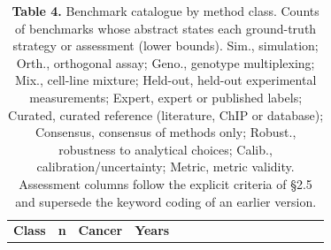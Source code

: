 \documentclass{article}
\begin{document}
\begin{longtable}[l]{@{}
  >{\raggedright\arraybackslash}p{}
  >{\raggedright\arraybackslash}p{}
  >{\raggedright\arraybackslash}p{}
  >{\raggedright\arraybackslash}p{}
  >{\raggedright\arraybackslash}p{}
  >{\raggedright\arraybackslash}p{}
  >{\raggedright\arraybackslash}p{}
  >{\raggedright\arraybackslash}p{}
  >{\raggedright\arraybackslash}p{}
  >{\raggedright\arraybackslash}p{}
  >{\raggedright\arraybackslash}p{}
  >{\raggedright\arraybackslash}p{}
  >{\raggedright\arraybackslash}p{}
  >{\raggedright\arraybackslash}p{}
  >{\raggedright\arraybackslash}p{}
  >{\raggedright\arraybackslash}p{}@{}}
\caption{\textbf{Table 4.} Benchmark catalogue by method class. Counts of
benchmarks whose abstract states each ground-truth strategy or
assessment (lower bounds). Sim., simulation; Orth., orthogonal assay;
Geno., genotype multiplexing; Mix., cell-line mixture; Held-out,
held-out experimental measurements; Expert, expert or published labels;
Curated, curated reference (literature, ChIP or database); Consensus,
consensus of methods only; Robust., robustness to analytical choices;
Calib., calibration/uncertainty; Metric, metric validity. Assessment
columns follow the explicit criteria of §2.5 and supersede the keyword
coding of an earlier version.}\tabularnewline
\toprule
\begin{minipage}[b]{\linewidth}\raggedright
\textbf{Class}
\end{minipage} & \begin{minipage}[b]{\linewidth}\raggedright
\textbf{n}
\end{minipage} & \begin{minipage}[b]{\linewidth}\raggedright
\textbf{Cancer}
\end{minipage} & \begin{minipage}[b]{\linewidth}\raggedright
\textbf{Years}
\end{minipage} & \begin{minipage}[b]{\linewidth}\raggedright

\end{minipage}
\end{longtable}
\end{document}

